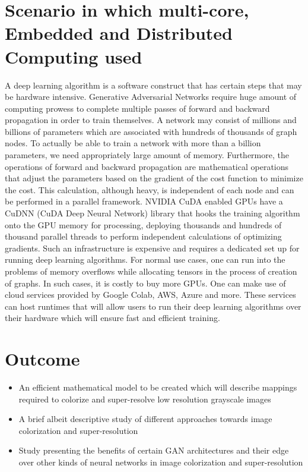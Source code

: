 \documentclass[oneside,a4paper,12pt]{report}
\begin{document}
\section{Scenario in which multi-core, Embedded and Distributed Computing used}
 A deep learning algorithm is a software construct that has certain steps that may be hardware intensive. Generative Adversarial Networks require huge amount of computing prowess to complete multiple passes of forward and backward propagation in order to train themselves. A network may consist of millions and billions of parameters which are associated with hundreds of thousands of graph nodes. To actually be able to train a network with more than a billion parameters, we need appropriately large amount of memory. Furthermore, the operations of forward and backward propagation are mathematical operations that adjust the parameters based on the gradient of the cost function to minimize the cost. This calculation, although heavy, is independent of each node and can be performed in a parallel framework. NVIDIA CuDA enabled GPUs have a CuDNN (CuDA Deep Neural Network) library that hooks the training algorithm onto the GPU memory for processing, deploying thousands and hundreds of thousand parallel threads to perform independent calculations of optimizing gradients. Such an infrastructure is expensive and requires a dedicated set up for running deep learning algorithms. For normal use cases, one can run into the problems of memory overflows while allocating tensors in the process of creation of graphs. In such cases, it is costly to buy more GPUs. One can make use of cloud services provided by Google Colab, AWS, Azure and more. These services can host runtimes that will allow users to run their deep learning algorithms over their hardware which will ensure fast and efficient training.


\section{Outcome}
\begin{itemize}
\item An efficient mathematical model to be created which will describe mappings required to colorize and super-resolve low resolution grayscale images
\item A brief albeit descriptive study of different approaches towards image colorization and super-resolution
\item Study presenting the benefits of certain GAN architectures and their edge over other kinds of neural networks in image colorization and super-resolution  
\end{itemize}
\end{document}
